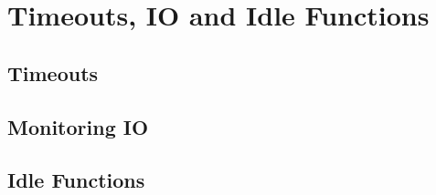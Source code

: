 \chapter{Timeouts, IO and Idle Functions}
\section{Timeouts}
\section{Monitoring IO}
\section{Idle Functions}
